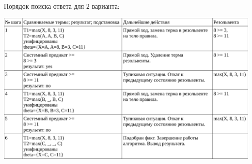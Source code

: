 Порядок поиска ответа для 2 варианта:

\begin{center}
	\includegraphics[width=\linewidth]{table2.pdf}
\end{center}
